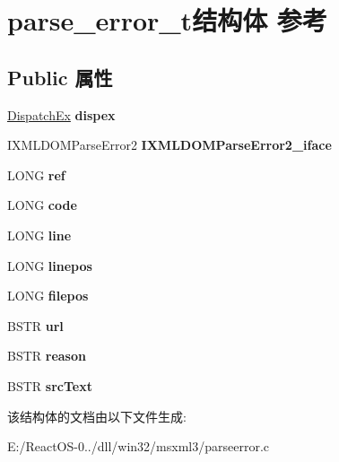 \hypertarget{structparse__error__t}{}\section{parse\+\_\+error\+\_\+t结构体 参考}
\label{structparse__error__t}
\subsection*{Public 属性}
\begin{DoxyCompactItemize}
\item 
\mbox{\label{structparse__error__t_a06961a7f3f978d801640cdf18c2fa59b}} 
\hyperlink{struct_dispatch_ex}{Dispatch\+Ex} {\bfseries dispex}
\item 
\mbox{\label{structparse__error__t_a7d07482627b3ea70b15f1480bf6a20d6}} 
I\+X\+M\+L\+D\+O\+M\+Parse\+Error2 {\bfseries I\+X\+M\+L\+D\+O\+M\+Parse\+Error2\+\_\+iface}
\item 
\mbox{\label{structparse__error__t_a4e7ac39b8c3d8fe6954537f025985226}} 
L\+O\+NG {\bfseries ref}
\item 
\mbox{\label{structparse__error__t_ab81c3eaef78e8a895c62117a32daf7ca}} 
L\+O\+NG {\bfseries code}
\item 
\mbox{\label{structparse__error__t_a309e93ae1e81526cdfd29c46b515bd9a}} 
L\+O\+NG {\bfseries line}
\item 
\mbox{\label{structparse__error__t_a7aa4ac4ef12cc7fd84d4d42bd9d64c73}} 
L\+O\+NG {\bfseries linepos}
\item 
\mbox{\label{structparse__error__t_abfe342e7034cfa0a898ff8f83bb38489}} 
L\+O\+NG {\bfseries filepos}
\item 
\mbox{\label{structparse__error__t_a88e8b0d4b04a2b5ad751191cad16286e}} 
B\+S\+TR {\bfseries url}
\item 
\mbox{\label{structparse__error__t_a67d0276b9b0ad05b3b9ca469f9039967}} 
B\+S\+TR {\bfseries reason}
\item 
\mbox{\label{structparse__error__t_a6ef28f66acdee8ab4623838bc46b64f8}} 
B\+S\+TR {\bfseries src\+Text}
\end{DoxyCompactItemize}


该结构体的文档由以下文件生成\+:\begin{DoxyCompactItemize}
\item 
E\+:/\+React\+O\+S-\/0../dll/win32/msxml3/parseerror.\+c\end{DoxyCompactItemize}
